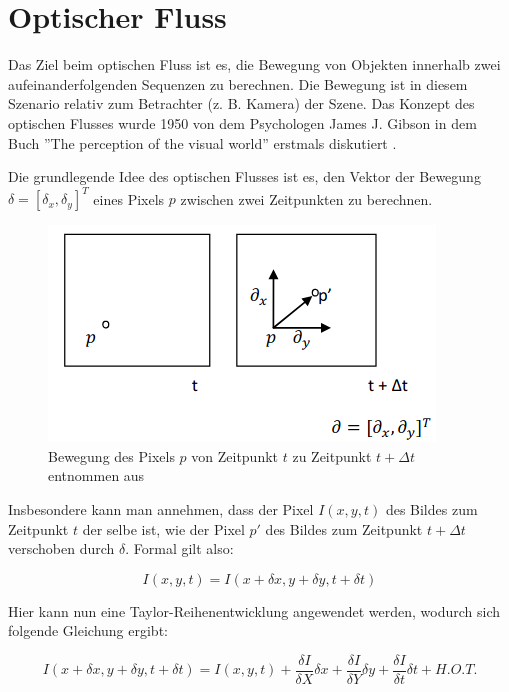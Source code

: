\section{Optischer Fluss}

Das Ziel beim optischen Fluss ist es, die Bewegung von Objekten innerhalb zwei aufeinanderfolgenden Sequenzen zu berechnen. Die Bewegung ist in diesem Szenario relativ zum Betrachter (z. B. Kamera) der Szene. Das Konzept des optischen Flusses wurde 1950 von dem Psychologen James J. Gibson in dem Buch ''The perception of the visual world'' erstmals diskutiert \citet{Gibson1950-GIBTPO-2}.

Die grundlegende Idee des optischen Flusses ist es, den Vektor der Bewegung $\delta = [\delta_x,\delta_y]^T$ eines Pixels $p$ zwischen zwei Zeitpunkten zu berechnen.


\begin{figure}[H]
\centering
\includegraphics[width=0.5\linewidth]{figures/Grundlagen/opticalFlowSimpel.png} 
\caption{Bewegung des Pixels $p$ von Zeitpunkt $t$ zu Zeitpunkt $t+\Delta t$ \label{fig:opticalFlowSimpel} entnommen aus \citep{articleOpticalFlowKanade}}
\end{figure}

Insbesondere kann man annehmen, dass der Pixel $I(x,y,t)$ des Bildes zum Zeitpunkt $t$ der selbe ist, wie der Pixel $p'$ des Bildes zum Zeitpunkt $t+\Delta t$ verschoben durch $\delta$. Formal gilt also:

\begin{equation}\label{eq:opFlow1}
I(x,y,t) = I(x + \delta x,y + \delta y,t + \delta t)
\end{equation}

Hier kann nun eine Taylor-Reihenentwicklung angewendet werden, wodurch sich folgende Gleichung ergibt:

\begin{equation}\label{eq:opFlow2}
I(x + \delta x,y + \delta y,t + \delta t) = I(x,y,t) + \frac{\delta I}{\delta X}\delta x + \frac{\delta I}{\delta Y}\delta y + \frac{\delta I}{\delta t}\delta t+ H.O.T.
\end{equation}

